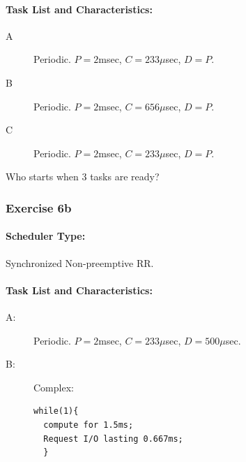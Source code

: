 \paragraph{Task List and Characteristics:}  
            \begin{description}
              \item [A] Periodic. $P = 2$msec, $C = 233\mu$sec, $D =P$.
              \item [B] Periodic. $P = 2$msec, $C = 656\mu$sec, $D =P$.
              \item [C] Periodic. $P = 2$msec, $C = 233\mu$sec, $D =P$.
        \end{description}
       Who starts when 3 tasks are ready? 

\subsubsection*{Exercise 6b}

\paragraph{Scheduler Type:} Synchronized Non-preemptive RR.
\paragraph{Task List and Characteristics:}  
            \begin{description}
                \item[A:] Periodic.  $P = 2$msec, $C = 233\mu$sec,
                           $D =500\mu$sec.
                \item[B:] Complex:
\begin{verbatim}
while(1){
  compute for 1.5ms;
  Request I/O lasting 0.667ms;
  }
\end{verbatim}
              \end{description}
 





 
